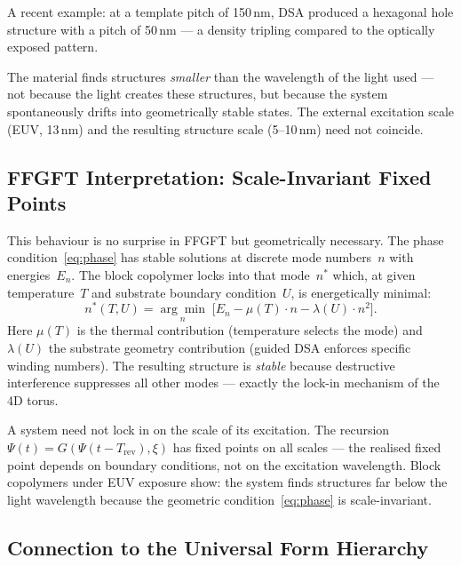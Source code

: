 \noindent A recent example: at a template pitch of 150\,nm,
DSA produced a hexagonal hole structure with a pitch of 50\,nm —
a density tripling compared to the optically exposed pattern.

\begin{warnbox}
The material finds structures \emph{smaller} than the wavelength of
the light used — not because the light creates these structures, but
because the system spontaneously drifts into geometrically stable
states. The external excitation scale (EUV, 13\,nm) and the resulting
structure scale (5--10\,nm) need not coincide.
\end{warnbox}

\subsection{FFGFT Interpretation: Scale-Invariant Fixed Points}

This behaviour is no surprise in FFGFT but geometrically necessary.
The phase condition~\eqref{eq:phase} has stable solutions at discrete
mode numbers~$n$ with energies~$E_n$.
The block copolymer locks into that mode~$n^*$ which, at given
temperature~$T$ and substrate boundary condition~$U$, is energetically
minimal:
\begin{equation}
  n^*(T, U) = \underset{n}{\arg\min}\;
    \bigl[ E_n - \mu(T)\cdot n - \lambda(U)\cdot n^2 \bigr].
\end{equation}
Here $\mu(T)$ is the thermal contribution (temperature selects the mode)
and $\lambda(U)$ the substrate geometry contribution (guided DSA
enforces specific winding numbers). The resulting structure is
\emph{stable} because destructive interference suppresses all other
modes — exactly the lock-in mechanism of the 4D torus.

\begin{keybox}
A system need not lock in on the scale of its excitation.
The recursion $\Psi(t) = G(\Psi(t - T_{\text{rev}}), \xi)$ has
fixed points on all scales — the realised fixed point depends on
boundary conditions, not on the excitation wavelength.
Block copolymers under EUV exposure show: the system finds
structures far below the light wavelength because the
geometric condition~\eqref{eq:phase} is scale-invariant.
\end{keybox}

\subsection{Connection to the Universal Form Hierarchy}

